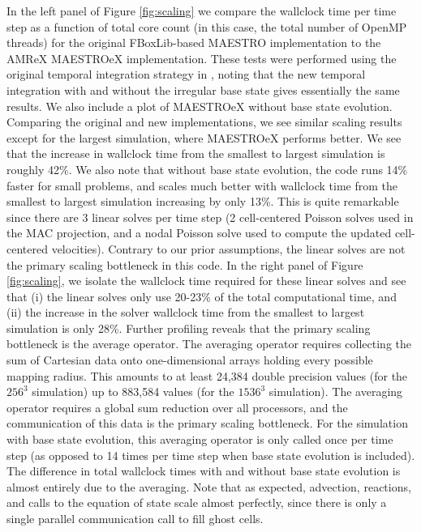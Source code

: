 In the left panel of Figure \ref{fig:scaling} we compare the wallclock time per time step as a function of total core count (in this case, the total number of OpenMP threads) for the original FBoxLib-based MAESTRO implementation to the AMReX MAESTROeX implementation.
These tests were performed using the original temporal integration strategy in \cite{MAESTRO_V}, noting that the new temporal integration with and without the irregular base state gives essentially the same results.
We also include a plot of MAESTROeX without base state evolution.
Comparing the original and new implementations, we see similar scaling results except for the largest simulation, where MAESTROeX performs better.
We see that the increase in wallclock time from the smallest to largest simulation is roughly 42\%.
We also note that without base state evolution, the code runs 14\% faster for small problems, and scales much better with wallclock time from the smallest to largest simulation increasing by only 13\%.
This is quite remarkable since there are 3 linear solves per time step (2 cell-centered Poisson solves used in the MAC projection, and a nodal Poisson solve used to compute the updated cell-centered velocities).
Contrary to our prior assumptions, the linear solves are not the primary scaling bottleneck in this code.
In the right panel of Figure \ref{fig:scaling}, we isolate the wallclock time required for these linear solves and see that (i) the linear solves only use 20-23\% of the total computational time, and (ii) the increase in the solver wallclock time from the smallest to largest simulation is only 28\%.
Further profiling reveals that the primary scaling bottleneck is the average operator.
The averaging operator requires collecting the sum of Cartesian data onto one-dimensional arrays holding every possible mapping radius.
This amounts to at least 24,384 double precision values (for the $256^3$ simulation) up to 883,584 values (for the $1536^3$ simulation).
The averaging operator requires a global sum reduction over all processors, and the communication of this data is the primary scaling bottleneck.
For the simulation with base state evolution, this averaging operator is only called once per time step (as opposed to 14 times per time step when base state evolution is included).
The difference in total wallclock times with and without base state evolution is almost entirely due to the averaging.
Note that as expected, advection, reactions, and calls to the equation of state scale almost perfectly, since there is only a single parallel communication call to fill ghost cells.



